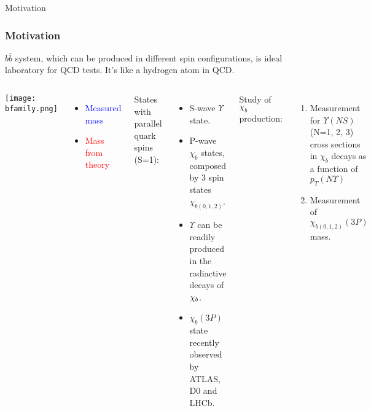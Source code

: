 \begin{frame}{Motivation}

\frametitle{Motivation}
$b\bar{b}$ system, which can be produced in different spin configurations, is
ideal laboratory for QCD tests. It's like a hydrogen atom in QCD.
\begin{columns}[c]
\texttt{[image: bfamily.png]}
\begin{itemize}
  \item \textcolor{blue}{Measured mass}
  \item \textcolor{red}{Mass from theory}
\end{itemize}
\fontsize{9pt}{7.2}\selectfont
States with parallel quark spins (S=1):
\begin{itemize}
  \item S-wave $\Upsilon$ state.
  \item P-wave $\chi_{b}$ states, composed by 3 spin states $\chi_{b(0,1,2)}$. 
  \item $\Upsilon$ can be readily produced in the radiactive decays of $\chi_{b}$.
  \item $\chi_{b}(3P)$ state recently observed by ATLAS, D0 and LHCb.
\end{itemize}
Study of $\chi_{b}$ production:
\begin{enumerate}
  \item Measurement for $\Upsilon(NS)$ (N=1, 2, 3) cross sections in $\chi_b$
  decays as a function of $p_T(N\Upsilon)$
  \item Measurement of $\chi_{b(0,1,2)}(3P)$ mass.
\end{enumerate}
\end{columns}

\end{frame}